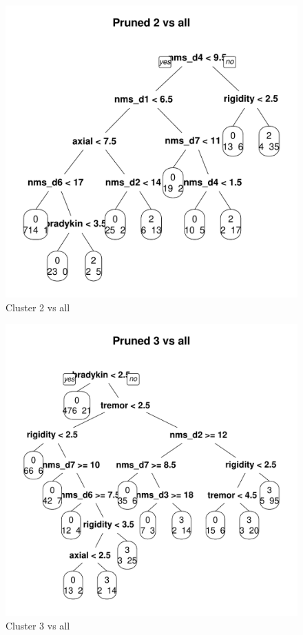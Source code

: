 \documentclass[letterpaper,12pt]{article}
\begin{document}
\begin{figure}[h]
  \centering
  \includegraphics[width=\linewidth]{dtree-2va-pruned.pdf}
  \caption{Cluster 2 vs all}
  \label{fig:2va}
\end{figure}
\begin{figure}[h]
  \centering
  \includegraphics[width=\linewidth]{dtree-3va-pruned.pdf}
  \caption{Cluster 3 vs all}
  \label{fig:3va}
\end{figure}
\end{document}
